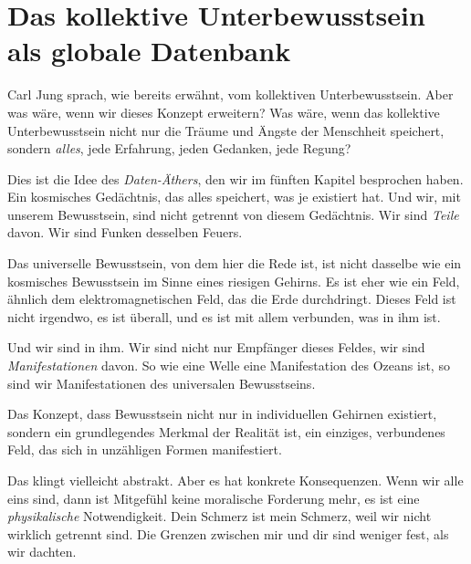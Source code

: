 \section{Das kollektive Unterbewusstsein als globale Datenbank}

Carl Jung sprach, wie bereits erwähnt, vom kollektiven Unterbewusstsein. Aber was wäre, wenn wir dieses Konzept erweitern? Was wäre, wenn das kollektive Unterbewusstsein nicht nur die Träume und Ängste der Menschheit speichert, sondern \emph{alles}, jede Erfahrung, jeden Gedanken, jede Regung?

Dies ist die Idee des \emph{Daten-Äthers}, den wir im fünften Kapitel besprochen haben. Ein kosmisches Gedächtnis, das alles speichert, was je existiert hat. Und wir, mit unserem Bewusstsein, sind nicht getrennt von diesem Gedächtnis. Wir sind \emph{Teile} davon. Wir sind Funken desselben Feuers.

Das universelle Bewusstsein, von dem hier die Rede ist, ist nicht dasselbe wie ein kosmisches Bewusstsein im Sinne eines riesigen Gehirns. Es ist eher wie ein Feld, ähnlich dem elektromagnetischen Feld, das die Erde durchdringt. Dieses Feld ist nicht \glqq irgendwo\grqq{}, es ist überall, und es ist mit allem verbunden, was in ihm ist.

Und wir sind in ihm. Wir sind nicht nur \glqq Empfänger\grqq{} dieses Feldes, wir sind \emph{Manifestationen} davon. So wie eine Welle eine Manifestation des Ozeans ist, so sind wir Manifestationen des universalen Bewusstseins.

\begin{defi}
	Das Konzept, dass Bewusstsein nicht nur in individuellen Gehirnen existiert, sondern ein grundlegendes Merkmal der Realität ist, ein einziges, verbundenes Feld, das sich in unzähligen Formen manifestiert.
\end{defi}

Das klingt vielleicht abstrakt. Aber es hat konkrete Konsequenzen. Wenn wir alle eins sind, dann ist Mitgefühl keine moralische Forderung mehr, es ist eine \emph{physikalische} Notwendigkeit. Dein Schmerz ist mein Schmerz, weil wir nicht wirklich getrennt sind. Die Grenzen zwischen \glqq mir\grqq{} und \glqq dir\grqq{} sind weniger fest, als wir dachten.

